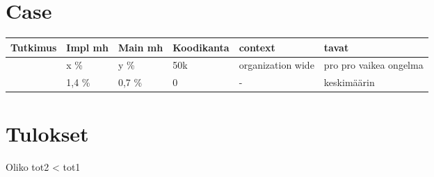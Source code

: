 \documentclass[finnish]{tktltiki2}
\theoremstyle{definition}
\theoremstyle{remark}
\begin{document}
\section{Case}
\begin{center}
    \begin{tabular}{ | l | l | l | l | l | p{4cm} |}
    \hline
    Tutkimus & Impl mh & Main mh & Koodikanta & context & tavat \\ \hline
    	~\cite{case} & x \% & y \% & 50k & organization wide & pro pro vaikea ongelma \\ \hline
	~\cite{costandbenefit} & 1,4 \% & 0,7 \% & 0 & - & keskimäärin \\ \hline
    \end{tabular}
\end{center}

\section{Tulokset}
Oliko tot2 < tot1


%
%
% 
%



\end{document}
